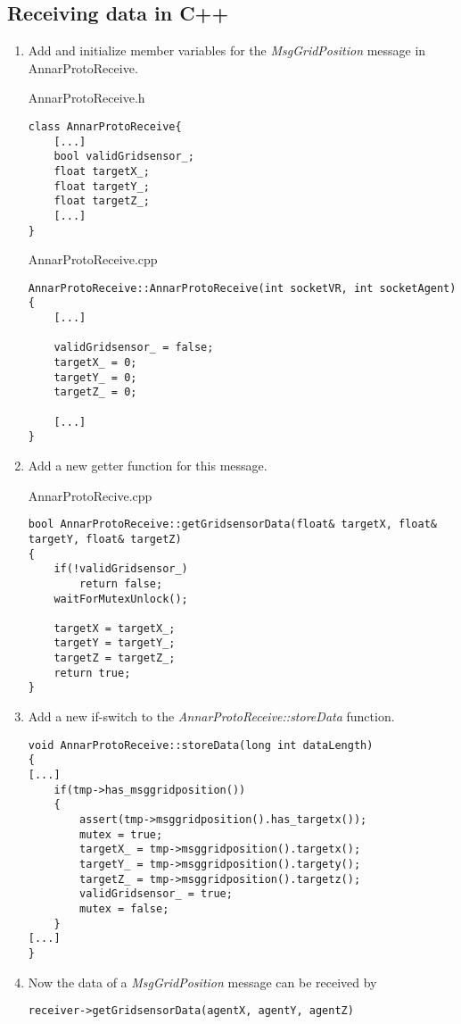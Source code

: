 \documentclass[a4paper,11pt,oneside,pdftex]{scrartcl}
\begin{document}
\subsection*{Receiving data in C++}
\begin{enumerate}
\item Add and initialize member variables for the \emph{MsgGridPosition} message in\\ \mbox{AnnarProtoReceive}.

AnnarProtoReceive.h
\begin{lstlisting}
class AnnarProtoReceive{
	[...]
	bool validGridsensor_;
	float targetX_;          
	float targetY_;        
	float targetZ_;
	[...]
}
\end{lstlisting}
AnnarProtoReceive.cpp
\begin{lstlisting}
AnnarProtoReceive::AnnarProtoReceive(int socketVR, int socketAgent)
{
	[...]

	validGridsensor_ = false;
	targetX_ = 0;
	targetY_ = 0;
	targetZ_ = 0;

	[...]
}
\end{lstlisting}

\item Add a new getter function for this message.

AnnarProtoRecive.cpp
\begin{lstlisting}
bool AnnarProtoReceive::getGridsensorData(float& targetX, float& targetY, float& targetZ)
{
	if(!validGridsensor_)
		return false;
	waitForMutexUnlock();

	targetX = targetX_;
	targetY = targetY_;
	targetZ = targetZ_;
	return true;
}

\end{lstlisting}

\item Add a new if-switch to the \emph{AnnarProtoReceive::storeData} function.

\begin{lstlisting}
void AnnarProtoReceive::storeData(long int dataLength)
{
[...]
	if(tmp->has_msggridposition())
	{
		assert(tmp->msggridposition().has_targetx());
		mutex = true;
		targetX_ = tmp->msggridposition().targetx();
		targetY_ = tmp->msggridposition().targety();
		targetZ_ = tmp->msggridposition().targetz();
		validGridsensor_ = true;
		mutex = false;
	}
[...]
}
\end{lstlisting}
\item Now the data of a \emph{MsgGridPosition} message can be received by
\begin{lstlisting}
receiver->getGridsensorData(agentX, agentY, agentZ)
\end{lstlisting}
\end{enumerate}
\end{document}
